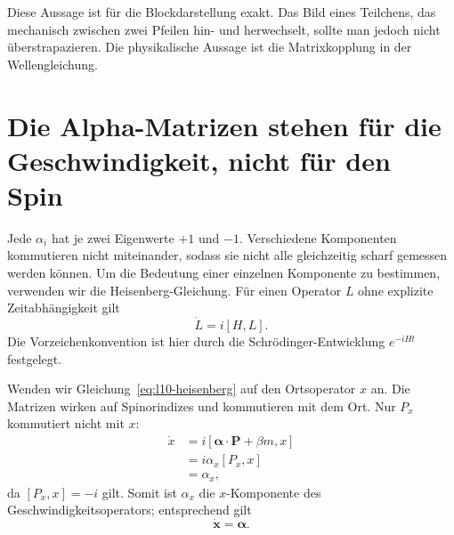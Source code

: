 Diese Aussage ist für die Blockdarstellung exakt. Das Bild eines Teilchens, das mechanisch zwischen zwei Pfeilen hin- und herwechselt, sollte man jedoch nicht überstrapazieren. Die physikalische Aussage ist die Matrixkopplung in der Wellengleichung.

\begin{classroomqa}
\end{classroomqa}

\begin{classroomqa}
\end{classroomqa}

\section{Die Alpha-Matrizen stehen für die Geschwindigkeit, nicht für den Spin}

Jede \(\alpha_i\) hat je zwei Eigenwerte \(+1\) und \(-1\). Verschiedene Komponenten kommutieren nicht miteinander, sodass sie nicht alle gleichzeitig scharf gemessen werden können. Um die Bedeutung einer einzelnen Komponente zu bestimmen, verwenden wir die Heisenberg-Gleichung. Für einen Operator \(L\) ohne explizite Zeitabhängigkeit gilt
\begin{equation}
\dot L=i[H,L].
\label{eq:l10-heisenberg}
\end{equation}
Die Vorzeichenkonvention ist hier durch die Schr\"odinger-Entwicklung \(e^{-iHt}\) festgelegt.

Wenden wir Gleichung~\eqref{eq:l10-heisenberg} auf den Ortsoperator \(x\) an. Die Matrizen wirken auf Spinorindizes und kommutieren mit dem Ort. Nur \(P_x\) kommutiert nicht mit \(x\):
\begin{align}
\dot x
&=i[\boldsymbol{\alpha}\cdot\mathbf P+\beta m,x]\\
&=i\alpha_x[P_x,x]\\
&=\alpha_x,
\label{eq:l10-velocity}
\end{align}
da \([P_x,x]=-i\) gilt. Somit ist \(\alpha_x\) die \(x\)-Komponente des Geschwindigkeitsoperators; entsprechend gilt
\begin{equation}
\dot{\mathbf x}=\boldsymbol{\alpha}.
\end{equation}

